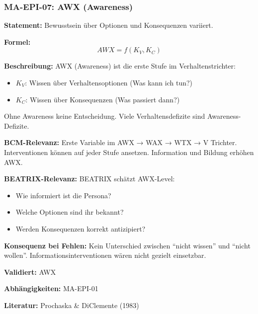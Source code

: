 
\subsubsection*{MA-EPI-07: AWX (Awareness)}

\textbf{Statement:} Bewusstsein über Optionen und Konsequenzen variiert.

\textbf{Formel:}
\begin{equation}
AWX = f(K_V, K_C)
\end{equation}

\textbf{Beschreibung:}
AWX (Awareness) ist die erste Stufe im Verhaltenstrichter:
\begin{itemize}
    \item $K_V$: Wissen über Verhaltensoptionen (Was kann ich tun?)
    \item $K_C$: Wissen über Konsequenzen (Was passiert dann?)
\end{itemize}
Ohne Awareness keine Entscheidung. Viele Verhaltensdefizite sind Awareness-Defizite.

\textbf{BCM-Relevanz:}
Erste Variable im AWX → WAX → WTX → V Trichter. Interventionen können auf jeder Stufe ansetzen. Information und Bildung erhöhen AWX.

\textbf{BEATRIX-Relevanz:}
BEATRIX schätzt AWX-Level:
\begin{itemize}
    \item Wie informiert ist die Persona?
    \item Welche Optionen sind ihr bekannt?
    \item Werden Konsequenzen korrekt antizipiert?
\end{itemize}

\textbf{Konsequenz bei Fehlen:}
Kein Unterschied zwischen ``nicht wissen'' und ``nicht wollen''. Informationsinterventionen wären nicht gezielt einsetzbar.

\textbf{Validiert:} AWX

\textbf{Abhängigkeiten:} MA-EPI-01

\textbf{Literatur:} Prochaska \& DiClemente (1983)


